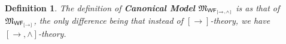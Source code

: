 \documentclass[12pt]{article}
\newtheorem{lem}[thm]{Lemma}
\newtheorem{dfn}[thm]{Definition}
\begin{document}



\begin{dfn}The definition of \textbf{Canonical Model} $  \mathfrak{M}_{{\sf WF_{[\rightarrow, \wedge]}}} $ is  as that of $ \mathfrak{M}_{{\sf WF_{[\rightarrow]}}}$, the only difference being that instead of $ {[\rightarrow]} $-theory, we have ${[\rightarrow, \wedge]} $-theory.
\end{dfn}

\end{document}
